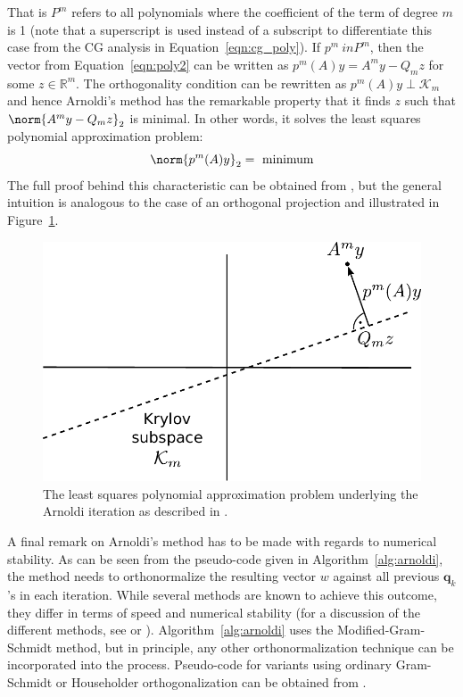 \noindent  That is $P^m$ refers to all polynomials where the coefficient of the term of degree $m$ is 1 (note that a superscript is used instead of a subscript to differentiate this case from the CG analysis in Equation~\hyperref[eqn:cg_poly]{\ref{eqn:cg_poly}}). If $p^m \ in P^m$, then the vector from Equation~\hyperref[eqn:poly2]{\ref{eqn:poly2}} can be written as $p^m(A)y=A^my-Q_mz$ for some $z \in \mathbb{R}^m$. The orthogonality condition can be rewritten as $p^m(A)y \perp \mathcal{K}_m$ and hence Arnoldi's method has the remarkable property that it finds $z$ such that $\norm{A^my-Q_mz}_2$ is minimal. In other words, it solves the least squares polynomial approximation problem:
\begin{equation}
\label{eqn:poly_arnoldi}
    \norm{p^m(A)y}_2 = \text{ minimum}
\end{equation}
\noindent The full proof behind this characteristic can be obtained from \cite{trefethen_numerical_1997}, but the general intuition is analogous to the case of an orthogonal projection and illustrated in Figure~\hyperref[fig:arnoldi]{\ref{fig:arnoldi}}.

\begin{figure}[h]
    \centering
    \includegraphics[width=0.6\linewidth]{figures/Arnoldi.pdf}
    \caption{The least squares polynomial approximation problem underlying the Arnoldi iteration as described in \cite{trefethen_numerical_1997}.}
    \label{fig:arnoldi}
\end{figure}

\noindent A final remark on Arnoldi's method has to be made with regards to numerical stability. As can be seen from the pseudo-code given in Algorithm~\hyperref[alg:arnoldi]{\ref{alg:arnoldi}}, the method needs to orthonormalize the resulting vector $w$ against all previous $\bm{q}_k$'s in each iteration. While several methods are known to achieve this outcome, they differ in terms of speed and numerical stability (for a discussion of the different methods, see \cite{golub_matrix_2013} or \cite{trefethen_numerical_1997}). Algorithm~\hyperref[alg:arnoldi]{\ref{alg:arnoldi}} uses the Modified-Gram-Schmidt method, but in principle, any other orthonormalization technique can be incorporated into the process. Pseudo-code for variants using ordinary Gram-Schmidt or Householder orthogonalization can be obtained from \cite{saad_iterative_2003}.


